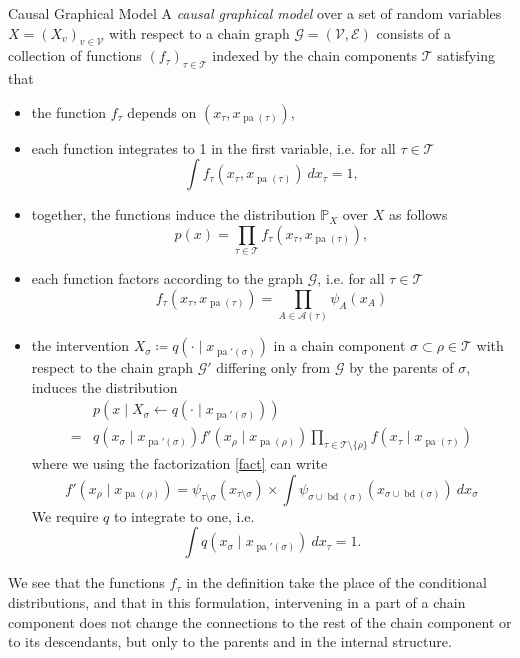 \documentclass[11pt, a4paper]{memoir}
\theoremstyle{break}
\theoremstyle{break}
\theoremstyle{nonumberplain}
\newcommand{\mP}{\mathbb{P}}
\DeclareMathOperator{\pa}{pa}
\DeclareMathOperator{\bd}{bd}
\begin{document}
\begin{mydefinition}{Causal Graphical Model}
A \emph{causal graphical model} over a set of random variables $X=(X_v)_{v\in \mathcal{V}}$ with respect to a chain graph $\mathcal{G}=(\mathcal{V},\mathcal{E})$ consists of a collection of functions $(f_\tau)_{\tau\in \mathscr{T}}$ indexed by the chain components $\mathscr{T}$ satisfying that
\begin{itemize}
	\item the function $f_\tau$ depends on $\left(x_\tau,x_{\pa(\tau)}\right)$,
	\item each function integrates to 1 in the first variable, i.e. for all $\tau\in \mathscr{T}$
	$$\int f_\tau\left(x_\tau,x_{\pa(\tau)}\right)\ dx_\tau=1,$$
	\item together, the functions induce the distribution $\mP_X$ over $X$ as follows
	$$p(x)=\prod_{\tau\in \mathscr{T}} f_ \tau\left(x_\tau,x_{\pa(\tau)}\right),$$
	\item each function factors according to the graph $\mathcal{G}$, i.e. for all $\tau\in \mathscr{T}$
	$$f_\tau\left(x_\tau,x_{\pa(\tau)}\right)=\prod_{A\in \mathscr{A}(\tau)}\psi_A(x_A)$$
	\item the intervention $X_\sigma\coloneqq q\left(\cdot \mid x_{\pa'(\sigma)}\right)$ in a chain component $\sigma\subset\rho\in \mathscr{T} $ with respect to the chain graph $\mathcal{G}'$ differing only from $\mathcal{G}$ by the parents of $\sigma$, induces the distribution
	\begin{align*}
	&p\left(x \mid X_\sigma\gets q\left(\cdot \mid x_{\pa'(\sigma)}\right)\right)\\
	=&q\left(x_\sigma \mid x_{\pa'(\sigma)}\right)f'\left(x_{\rho}\mid x_{\pa(\rho)}\right)\prod_{\tau\in \mathscr{T}\setminus\{\rho\}} f\left(x_\tau\mid x_{\pa(\tau)}\right)
	\end{align*}
	where we using the factorization \ref{fact} can write
	$$f'\left(x_{\rho}\mid x_{\pa(\rho)}\right)=\psi_{\tau\setminus\sigma}\left(x_{\tau\setminus \sigma}\right)\times \int \psi_{\sigma\cup\bd(\sigma)}\left(x_{\sigma\cup\bd(\sigma)}\right)\ dx_\sigma$$
	We require $q$ to integrate to one, i.e.
	$$\int q\left(x_\sigma\mid x_{\pa'(\sigma)}\right)\ dx_\tau=1.$$
\end{itemize}
\end{mydefinition}
We see that the functions $f_\tau$ in the definition take the place of the conditional distributions, and that in this formulation, intervening in a part of a chain component does not change the connections to the rest of the chain component or to its descendants, but only to the parents and in the internal structure.
\end{document}
